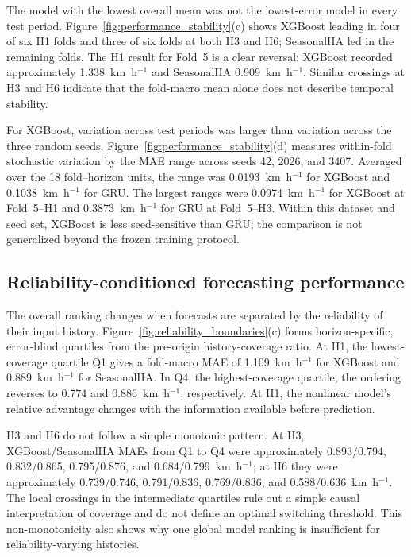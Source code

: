 \documentclass[pdflatex,sn-basic,Numbered]{sn-jnl}
\begin{document}
The model with the lowest overall mean was not the lowest-error model in every test period. Figure~\ref{fig:performance_stability}(c) shows XGBoost leading in four of six H1 folds and three of six folds at both H3 and H6; SeasonalHA led in the remaining folds. The H1 result for Fold~5 is a clear reversal: XGBoost recorded approximately 1.338~km~h$^{-1}$ and SeasonalHA 0.909~km~h$^{-1}$. Similar crossings at H3 and H6 indicate that the fold-macro mean alone does not describe temporal stability.

For XGBoost, variation across test periods was larger than variation across the three random seeds. Figure~\ref{fig:performance_stability}(d) measures within-fold stochastic variation by the MAE range across seeds 42, 2026, and 3407. Averaged over the 18 fold--horizon units, the range was 0.0193~km~h$^{-1}$ for XGBoost and 0.1038~km~h$^{-1}$ for GRU. The largest ranges were 0.0974~km~h$^{-1}$ for XGBoost at Fold~5--H1 and 0.3873~km~h$^{-1}$ for GRU at Fold~5--H3. Within this dataset and seed set, XGBoost is less seed-sensitive than GRU; the comparison is not generalized beyond the frozen training protocol.

\subsection{Reliability-conditioned forecasting performance}
\label{subsec:reliability-results}

The overall ranking changes when forecasts are separated by the reliability of their input history. Figure~\ref{fig:reliability_boundaries}(c) forms horizon-specific, error-blind quartiles from the pre-origin history-coverage ratio. At H1, the lowest-coverage quartile Q1 gives a fold-macro MAE of 1.109~km~h$^{-1}$ for XGBoost and 0.889~km~h$^{-1}$ for SeasonalHA. In Q4, the highest-coverage quartile, the ordering reverses to 0.774 and 0.886~km~h$^{-1}$, respectively. At H1, the nonlinear model's relative advantage changes with the information available before prediction.

H3 and H6 do not follow a simple monotonic pattern. At H3, XGBoost/SeasonalHA MAEs from Q1 to Q4 were approximately 0.893/0.794, 0.832/0.865, 0.795/0.876, and 0.684/0.799~km~h$^{-1}$; at H6 they were approximately 0.739/0.746, 0.791/0.836, 0.769/0.836, and 0.588/0.636~km~h$^{-1}$. The local crossings in the intermediate quartiles rule out a simple causal interpretation of coverage and do not define an optimal switching threshold. This non-monotonicity also shows why one global model ranking is insufficient for reliability-varying histories.
\end{document}
